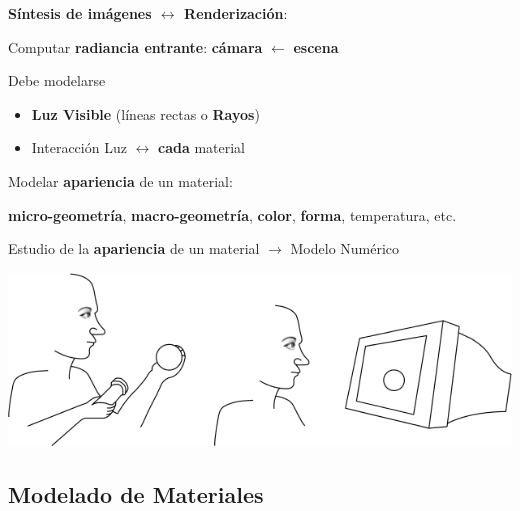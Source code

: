 \documentclass[spanish,unknownkeysallowed,10pt]{beamer}
\begin{document}
\begin{frame}{}

\textbf{Síntesis de imágenes $\leftrightarrow$ Renderización}:

Computar \textbf{radiancia entrante}:  \textbf{cámara}  $\leftarrow$ \textbf{escena}

\vspace{0.2cm}

\begin{block}{Debe modelarse}
\begin{itemize}
\item \textbf{Luz Visible} (líneas rectas o \textbf{Rayos})
\item Interacción Luz $\leftrightarrow$ \textbf{cada} material
\end{itemize}
\end{block}

\vspace{0.2cm}

Modelar \textbf{apariencia} de un material:

\textbf{micro-geometría}, \textbf{macro-geometría}, \textbf{color}, \textbf{forma}, temperatura, etc.

\vspace{0.2cm}

Estudio de la \textbf{apariencia} de un material $\rightarrow$ Modelo Numérico

\centerline{\includegraphics[scale = 0.25]{../figures/apariencia}}

\end{frame}

\subsection{Modelado de Materiales}
\end{document}
